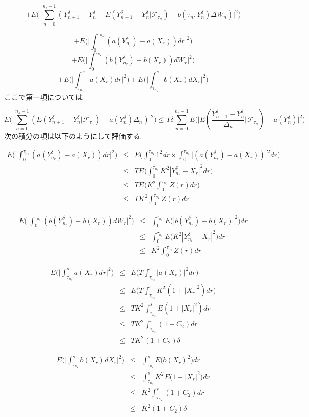 \documentclass[a4paper,dvipdfmx]{jreport}
\numberwithin{equation}{section}
\def\F{\mathcal F}
\def\eqa{\begin{eqnarray}}
\def\eqax{\end{eqnarray}}
\begin{document}
\[
+ E \big( \big|
\sum_{n=0}^{n_s-1} ( Y^\delta_{n+1} - Y^\delta_n
- E(Y^\delta_{n+1} - Y^\delta_n | \F_{\tau_n})
- b(\tau_n,Y_n^\delta)\Delta W_n)
\big| ^2 \big) 
\]

\[
+ E \big( \big|
\int_0^{\tau_{n_s}} ( a(Y^\delta_{n_r}) - a(X_r) )dr 
\big| ^2 \big) 
\]
\[
+ E \big( \big|
\int_0^{\tau_{n_s}} ( b(Y^\delta_{n_r}) - b(X_r) )dW_r 
\big| ^2 \big) 
\]
\[
+ E \big( \big|
\int_{\tau_{n_s}}^s a(X_r)dr
\big| ^2 \big) 
+ E \big( \big|
\int_{\tau_{n_s}}^s b(X_r)dX_r
\big| ^2 \big) 
\]
ここで第一項については

\[
E \big(  \big|
\sum_{n=0}^{n_s-1} (E(Y_{n+1}^\delta - Y_n^\delta | \F_{\tau_n}) - a(Y_n^\delta)\Delta_n )
\big| ^2 \big)
\le
T\delta \sum_{n=0}^{n_s-1} E \big( \big| E( \frac{Y^\delta_{n+1} - Y^\delta_n}{\Delta_n} | \F_{\tau_n})
- a(Y_n^\delta)
 \big|^2 \big)  
\]
次の積分の項は以下のようにして評価する.

\eqa
E \big( \big| \int_0^{\tau_{n_s}} ( a(Y^\delta_{n_r}) - a(X_r) )dr \big| ^2 \big)  &\le&
E \big( \int_0^{\tau_{n_s}} 1^2 dr \times \int_0^{\tau_{n_s}}\big| ( a(Y^\delta_{n_r}) - a(X_r) ) \big| ^2 dr \big) \\
&\le&T E \big(\int_0^{\tau_{n_s}} K^2 |Y^\delta_{n_r} - X_r|^2dr \big) \\
&\le&T E \big(K^2 \int_0^{\tau_{n_s}} Z(r) dr \big) \\
&\le& TK^2 \int_0^{\tau_{n_s}} Z(r) dr
\eqax

\eqa
E \big( \big| \int_0^{\tau_{n_s}} ( b(Y^\delta_{n_r}) - b(X_r) )dW_r  \big| ^2 \big)  &\le&
\int_0^{\tau_{n_s}} E \big(   \big|b(Y^\delta_{n_r}) - b(X_r) \big| ^2 \big) dr   \\
&\le& \int_0^{\tau_{n_s}} E \big(   K^2 |Y^\delta_{n_r} - X_r|^2 \big) dr   \\
&\le&  K^2 \int_0^{\tau_{n_s}}  Z(r) dr 
\eqax

\eqa
E \big( \big| \int_{\tau_{n_s}}^s a(X_r)dr \big| ^2 \big) &\le&
E \big( T \int_{\tau_{n_s}}^s \big|  a(X_r) \big| ^2  dr \big)\\
&\le& E \big(T \int_{\tau_{n_s}}^s K^2 (1 + |X_r|^2)dr \big) \\
&\le& TK^2 \int_{\tau_{n_s}}^s  E(1 + |X_r|^2)dr \\
&\le&TK^2 \int_{\tau_{n_s}}^s (1 + C_2) dr\\
&\le& TK^2 (1+C_2)\delta
\eqax

\eqa
E \big( \big| \int_{\tau_{n_s}}^s b(X_r)dX_r \big| ^2 \big) &\le&
\int_{\tau_{n_s}}^s E \big(b(X_r)^2\big)dr \\
&\le&\int_{\tau_{n_s}}^s K^2 E \big(1+|X_r|^2\big)dr \\
&\le& K^2 \int_{\tau_{n_s}}^s  (1+C_2) dr\\
&\le& K^2 (1+C_2) \delta
\eqax
\end{document}
